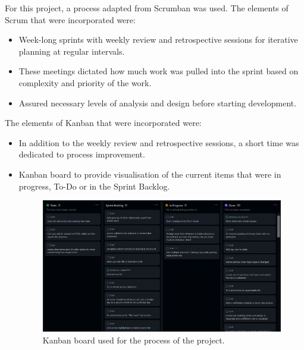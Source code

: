 For this project, a process adapted from Scrumban was used. The elements of Scrum that were incorporated were:  
\begin{itemize}
	\item Week-long sprints with weekly review and retrospective sessions for iterative planning at regular intervals.
	\item These meetings dictated how much work was pulled into the sprint based on complexity and priority of the work.
	\item Assured necessary levels of analysis and design before starting development.
\end{itemize}
The elements of Kanban that were incorporated were:
\begin{itemize}
	\item In addition to the weekly review and retrospective sessions, a short time was dedicated to process improvement.
	\item Kanban board to provide visualisation of the current items that were in progress, To-Do or in the Sprint Backlog.
	
	\begin{figure}[h!]
		\centering
		\includegraphics[width=\textwidth]{kanban}
		\caption{Kanban board used for the process of the project.}
		\label{fig:kanban}
	\end{figure}
\end{itemize}
